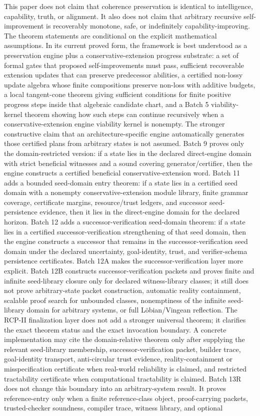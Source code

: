 \documentclass[11pt]{article}
\newcommand{\1}{\mathbf{1}}
\begin{document}
This paper does not claim that coherence preservation is identical to intelligence, capability, truth, or alignment. It also does not claim that arbitrary recursive self-improvement is recoverably monotone, safe, or indefinitely capability-improving. The theorem statements are conditional on the explicit mathematical assumptions. In its current proved form, the framework is best understood as a preservation engine plus a conservative-extension progress substrate: a set of formal gates that proposed self-improvements must pass, sufficient recoverable extension updates that can preserve predecessor abilities, a certified non-lossy update algebra whose finite compositions preserve non-loss with additive budgets, a local tangent-cone theorem giving sufficient conditions for finite positive progress steps inside that algebraic candidate chart, and a Batch 5 viability-kernel theorem showing how such steps can continue recursively when a conservative-extension engine viability kernel is nonempty. The stronger constructive claim that an architecture-specific engine automatically generates those certified plans from arbitrary states is not assumed. Batch 9 proves only the domain-restricted version: if a state lies in the declared direct-engine domain with strict beneficial witnesses and a sound covering generator/certifier, then the engine constructs a certified beneficial conservative-extension word. Batch 11 adds a bounded seed-domain entry theorem: if a state lies in a certified seed domain with a nonempty conservative-extension module library, finite grammar coverage, certificate margins, resource/trust ledgers, and successor seed-persistence evidence, then it lies in the direct-engine domain for the declared horizon. Batch 12 adds a successor-verification seed-domain theorem: if a state lies in a certified successor-verification strengthening of that seed domain, then the engine constructs a successor that remains in the successor-verification seed domain under the declared uncertainty, goal-identity, trust, and verifier-schema persistence certificates. Batch 12A makes the successor-verification layer more explicit. Batch 12B constructs successor-verification packets and proves finite and infinite seed-library closure only for declared witness-library classes; it still does not prove arbitrary-state packet construction, automatic reality containment, scalable proof search for unbounded classes, nonemptiness of the infinite seed-library domain for arbitrary systems, or full L\"obian/Vingean reflection. The RCP-II finalization layer does not add a stronger universal theorem; it clarifies the exact theorem status and the exact invocation boundary. A concrete implementation may cite the domain-relative theorem only after supplying the relevant seed-library membership, successor-verification packet, builder trace, goal-identity transport, anti-circular trust evidence, reality-containment or misspecification certificate when real-world reliability is claimed, and restricted tractability certificate when computational tractability is claimed. Batch 13R does not change this boundary into an arbitrary-system result. It proves reference-entry only when a finite reference-class object, proof-carrying packets, trusted-checker soundness, compiler trace, witness library, and optional 
\end{document}
